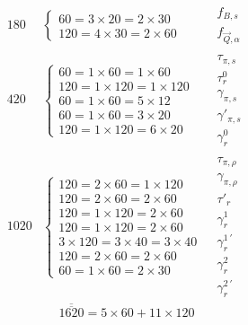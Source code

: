 \documentclass[11pt,a4paper]{article}
\begin{document}
\[
\begin{array}{rll}
180 & \left\lbrace \begin{array}{l}
  60 = 3\times 20 = 2\times 30 \\
  120 = 4\times 30 = 2\times 60
  \end{array}\right. &
  \begin{array}{l} f_{B,s} \\ f_{\vec{Q},\alpha} \end{array} \\[1ex]
420 & \left\lbrace \begin{array}{l}
  60 = 1\times 60 = 1\times 60 \\
  120 = 1\times 120 = 1\times 120 \\
  60 = 1\times 60 = 5\times 12 \\
  60 = 1\times 60 = 3\times 20 \\
  120 = 1\times 120 = 6\times 20
  \end{array}\right. &
  \begin{array}{l} \tau_{\pi,s} \\ \tau^{0}_{r} \\ \gamma_{\pi,s} \\
  \gamma'_{\pi,s} \\ \gamma^{0}_{r} \end{array} \\[1ex]
1020 & \left\lbrace \begin{array}{l}
  120 = 2\times 60 = 1\times 120 \\
  120 = 2\times 60 = 2\times 60 \\
  120 = 1\times 120 = 2\times 60 \\
  120 = 1\times 120 = 2\times 60 \\
  3\times 120 = 3\times 40 = 3\times 40 \\
  120 = 2\times 60 = 2\times 60 \\
  60 = 1\times 60 = 2\times 30
  \end{array}\right. &
  \begin{array}{l} \tau_{\pi,\rho} \\ \gamma_{\pi,\rho} \\ \tau'_{r} \\
  \gamma^{1}_{r} \\ \gamma^{1\,\prime}_{r} \\ \gamma^{2}_{r} \\
  \gamma^{2\,\prime}_{r} \end{array}
\end{array}
\]
\[
\overline{\overline{1620}} = 5\times 60 + 11\times 120
\]
\end{document}
